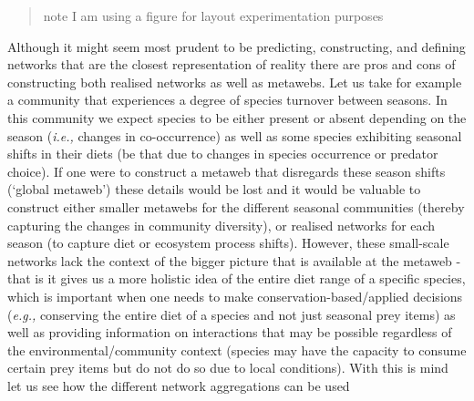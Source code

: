 \documentclass[
]{article}
\begin{document}
\begin{tcolorbox}[enhanced jigsaw, colbacktitle=quarto-callout-note-color!10!white, breakable, left=2mm, opacitybacktitle=0.6, titlerule=0mm, colframe=quarto-callout-note-color-frame, rightrule=.15mm, title=\textcolor{quarto-callout-note-color}{\faInfo}\hspace{0.5em}{Box 1 - Why we need to aggregate networks at different scales: A
hypothetical case study}, opacityback=0, bottomtitle=1mm, toptitle=1mm, coltitle=black, toprule=.15mm, bottomrule=.15mm, arc=.35mm, leftrule=.75mm, colback=white]

\begin{quote}
note I am using a figure for layout experimentation purposes
\end{quote}

Although it might seem most prudent to be predicting, constructing, and
defining networks that are the closest representation of reality there
are pros and cons of constructing both realised networks as well as
metawebs. Let us take for example a community that experiences a degree
of species turnover between seasons. In this community we expect species
to be either present or absent depending on the season (\emph{i.e.,}
changes in co-occurrence) as well as some species exhibiting seasonal
shifts in their diets (be that due to changes in species occurrence or
predator choice). If one were to construct a metaweb that disregards
these season shifts (`global metaweb') these details would be lost and
it would be valuable to construct either smaller metawebs for the
different seasonal communities (thereby capturing the changes in
community diversity), or realised networks for each season (to capture
diet or ecosystem process shifts). However, these small-scale networks
lack the context of the bigger picture that is available at the metaweb
- that is it gives us a more holistic idea of the entire diet range of a
specific species, which is important when one needs to make
conservation-based/applied decisions (\emph{e.g.,} conserving the entire
diet of a species and not just seasonal prey items) as well as providing
information on interactions that may be possible regardless of the
environmental/community context (species may have the capacity to
consume certain prey items but do not do so due to local conditions).
With this is mind let us see how the different network aggregations can
be used

\begin{figure}[H]

\centering{

}
\end{figure}
\end{tcolorbox}
\end{document}
